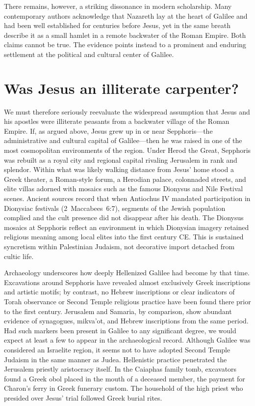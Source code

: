 There remains, however, a striking dissonance in modern scholarship.
Many contemporary authors acknowledge that Nazareth lay at the heart of Galilee and had been well established for centuries before Jesus,
yet in the same breath describe it as a small hamlet in a remote backwater of the Roman Empire.
Both claims cannot be true.
The evidence points instead to a prominent and enduring settlement at the political and cultural center of Galilee.

\section{Was Jesus an illiterate carpenter?}\label{sec:nazareth-was-not-a-backwater-village.}

We must therefore seriously reevaluate the widespread assumption that Jesus and his apostles were illiterate peasants from a backwater village of the Roman Empire.
If, as argued above, Jesus grew up in or near Sepphoris---the administrative and cultural capital of Galilee---then he was raised in one of the most cosmopolitan environments of the region.
Under Herod the Great, Sepphoris was rebuilt as a royal city and regional capital rivaling Jerusalem in rank and splendor.
Within what was likely walking distance from Jesus' home stood a Greek theater, a Roman-style forum, a Herodian palace, colonnaded streets, and elite villas adorned with mosaics such as the famous Dionysus and Nile Festival scenes.
Ancient sources record that when Antiochus IV mandated participation in Dionysiac festivals (2~Maccabees~6:7), segments of the Jewish population complied and the cult presence did not disappear after his death.
The Dionysus mosaics at Sepphoris reflect an environment in which Dionysian imagery retained religious meaning among local elites into the first century CE.
This is sustained syncretism within Palestinian Judaism, not decorative import detached from cultic life.

Archaeology underscores how deeply Hellenized Galilee had become by that time.
Excavations around Sepphoris have revealed almost exclusively Greek inscriptions and artistic motifs; by contrast, no Hebrew inscriptions or clear indicators of Torah observance or Second Temple religious practice have been found there prior to the first century.
Jerusalem and Samaria, by comparison, show abundant evidence of synagogues, mikva’ot, and Hebrew inscriptions from the same period.
Had such markers been present in Galilee to any significant degree, we would expect at least a few to appear in the archaeological record.
Although Galilee was considered an Israelite region, it seems not to have adopted Second Temple Judaism in the same manner as Judea.
Hellenistic practice penetrated the Jerusalem priestly aristocracy itself.
In the Caiaphas family tomb, excavators found a Greek obol placed in the mouth of a deceased member, the payment for Charon's ferry in Greek funerary custom.
The household of the high priest who presided over Jesus' trial followed Greek burial rites.

